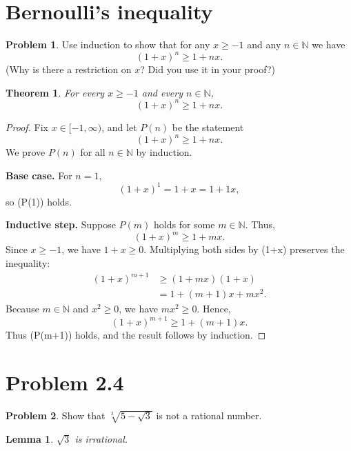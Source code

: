 \documentclass{article}
\newtheorem{lemma}{Lemma}
\newtheorem{theorem}{Theorem}
\theoremstyle{definition}
\newtheorem*{problem}{Problem}
\begin{document}
\clearpage
\section{Bernoulli's inequality}

\begin{problem}
Use induction to show that for any $x\geq -1$ and any $n\in\mathbb{N}$ we have
\[
(1+x)^n\geq 1+nx.
\]
(Why is there a restriction on $x$? Did you use it in your proof?)
\end{problem}

\begin{theorem}
For every \(x\geq -1\) and every \(n\in\mathbb{N}\),
\[
(1+x)^n\geq 1+nx.
\]
\end{theorem}

\begin{proof}
Fix \(x\in[-1,\infty)\), and let \(P(n)\) be the statement
\[
(1+x)^n\geq 1+nx.
\]
We prove \(P(n)\) for all \(n\in\mathbb{N}\) by induction.

\textbf{Base case.} For \(n=1\),
\[
(1+x)^1=1+x=1+1x,
\]
so (P(1)) holds.

\textbf{Inductive step.} Suppose \(P(m)\) holds for some \(m\in\mathbb{N}\).
Thus,
\[
(1+x)^m\geq 1+mx.
\]
Since \(x\geq -1\), we have \(1+x\geq 0\).
Multiplying both sides by (1+x) preserves the inequality:
\begin{align*}
(1+x)^{m+1}
&\geq(1+mx)(1+x)\\
&=1+(m+1)x+mx^2.
\end{align*}
Because \(m\in\mathbb{N}\) and \(x^2\geq 0\), we have \(mx^2\geq 0\).
Hence,
\[
(1+x)^{m+1}\geq 1+(m+1)x.
\]
Thus (P(m+1)) holds, and the result follows by induction.
\end{proof}

\clearpage
\section{Problem 2.4}

\begin{problem}
Show that $\sqrt[3]{5-\sqrt{3}}$ is not a rational number.
\end{problem}

\begin{lemma}\label{lem:sqrt-three}
\(\sqrt{3}\) is irrational.
\end{lemma}
\end{document}
